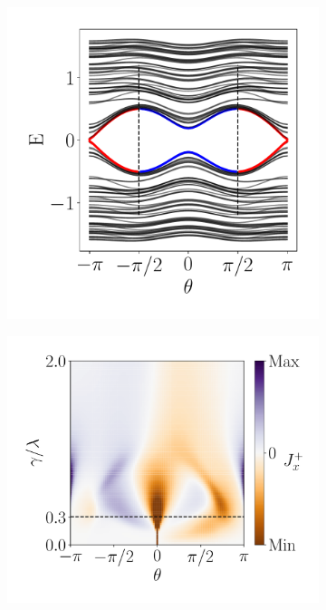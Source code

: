 \begin{figure}[h!]
     \centering
    \captionsetup[sub]{font=small}
     \begin{minipage}[h!]{1\textwidth}
         \begin{subfigure}[b!]{0.3 \textwidth}
             \caption{}
             \includegraphics[width=\textwidth]{Imagenes/Resultados_pump_Fractal/x/param_pump_A=0.5x.pdf}
         \end{subfigure}\hspace*{-0.5em}
         \begin{subfigure}[b!]{0.35 \textwidth}
             \caption{}
             \includegraphics[width=\textwidth]{Imagenes/Resultados_pump_Fractal/x/current_square_pumpx.pdf}

\end{subfigure}
\end{minipage}
\end{figure}
